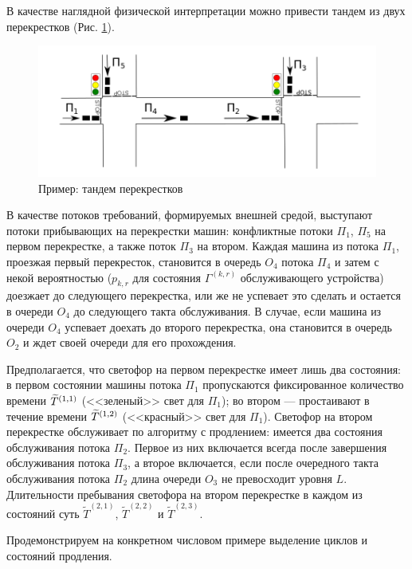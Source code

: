 \documentclass[a4paper,12pt,russian]{extarticle}
\newcommand{\ga}[1]{\Gamma^{\left( #1 \right)} }
\begin{document}
В качестве наглядной физической интерпретации можно привести тандем из двух перекрестков (Рис. \ref{crossroads}).
\begin{figure}[h]
\includegraphics[scale=0.5]{Crossroads.png} 
\caption{Пример: тандем перекрестков}
\label{crossroads}
\end{figure}
В качестве потоков требований, формируемых внешней средой, выступают потоки прибывающих на перекрестки машин: конфликтные потоки $\Pi_1$, $\Pi_5$ на первом перекрестке, а также поток $\Pi_3$ на втором. Каждая машина из потока $\Pi_1$, проезжая первый перекресток, становится в очередь $O_4$ потока $\Pi_4$ и затем с некой вероятностью ($p_{k,r}$ для состояния $\ga{k,r}$ обслуживающего устройства) доезжает до следующего перекрестка, или же не успевает это сделать и остается в очереди $O_4$ до следующего такта обслуживания. В случае, если машина из очереди $O_4$ успевает доехать до второго перекрестка, она становится в очередь $O_2$ и ждет своей очереди для его прохождения.

Предполагается, что светофор на первом перекрестке имеет лишь два состояния: в первом состоянии машины потока $\Pi_1$ пропускаются фиксированное количество времени $\widetilde T^{\left(1,1\right)}$ (<<зеленый>> свет для $\Pi_1$); во втором --- простаивают в течение времени $\widetilde T^{\left(1,2\right)}$ (<<красный>> свет для $\Pi_1$). Светофор на втором перекрестке обслуживает по алгоритму с продлением: имеется два состояния обслуживания потока $\Pi_2$. Первое из них включается всегда после завершения обслуживания потока $\Pi_3$, а второе включается, если после очередного такта обслуживания потока $\Pi_2$ длина очереди $O_3$ не превосходит уровня $L$.
Длительности пребывания светофора на втором перекрестке в каждом из состояний суть $\widetilde T^{(2,1)}$, $\widetilde T^{(2,2)}$ и $\widetilde T^{(2,3)}$.

%
Продемонстрируем на конкретном числовом примере выделение циклов и состояний продления.
 
\end{document}
